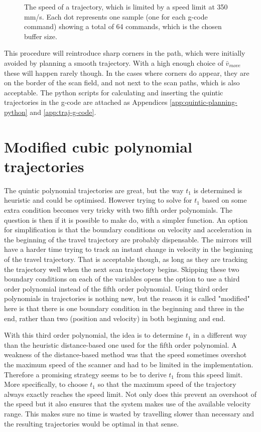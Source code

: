 \begin{figure}
    \centering
    
    \caption{The speed of a trajectory, which is limited by a speed limit at 350 mm/s. Each dot represents one sample (one for each g-code command) showing a total of 64 commands, which is the chosen buffer size.}
    \label{fig:speed-limit}
\end{figure}

This procedure will reintroduce sharp corners in the path, which were initially avoided by planning a smooth trajectory. With a high enough choice of $\bar{v}_{move}$ these will happen rarely though. In the cases where corners do appear, they are on the border of the scan field, and not next to the scan paths, which is also acceptable. The python scripts for calculating and inserting the quintic trajectories in the g-code are attached as Appendices \ref{app:quintic-planning-python} and \ref{app:traj-g-code}.

\section{Modified cubic polynomial trajectories}

The quintic polynomial trajectories are great, but the way $t_1$ is determined is heuristic and could be optimised. However trying to solve for $t_1$ based on some extra condition becomes very tricky with two fifth order polynomials. The question is then if it is possible to make do, with a simpler function. An option for simplification is that the boundary conditions on velocity and acceleration in the beginning of the travel trajectory are probably dispensable. The mirrors will have a harder time trying to track an instant change in velocity in the beginning of the travel trajectory. That is acceptable though, as long as they are tracking the trajectory well when the next scan trajectory begins. Skipping these two boundary conditions on each of the variables opens the option to use a third order polynomial instead of the fifth order polynomial. Using third order polynomials in trajectories is nothing new, but the reason it is called "modified" here is that there is one boundary condition in the beginning and three in the end, rather than two (position and velocity) in both beginning and end.

With this third order polynomial, the idea is to determine $t_1$ in a different way than the heuristic distance-based one used for the fifth order polynomial. A weakness of the distance-based method was that the speed sometimes overshot the maximum speed of the scanner and had to be limited in the implementation. Therefore a promising strategy seems to be to derive $t_1$ from this speed limit. More specifically, to choose $t_1$ so that the maximum speed of the trajectory always exactly reaches the speed limit. Not only does this prevent an overshoot of the speed but it also ensures that the system makes use of the available velocity range. This makes sure no time is wasted by travelling slower than necessary and the resulting trajectories would be optimal in that sense.

